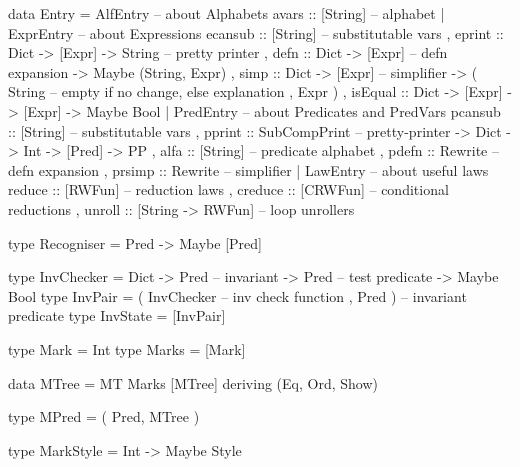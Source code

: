 \begin{code}
data Entry =
   AlfEntry {   -- about Alphabets
    avars   :: [String]  -- alphabet
   }
 | ExprEntry { -- about Expressions
     ecansub :: [String]                   -- substitutable vars
   , eprint  :: Dict -> [Expr] -> String   -- pretty printer
   , defn    :: Dict -> [Expr]             -- defn expansion
             -> Maybe (String, Expr)
   , simp    :: Dict -> [Expr]                 -- simplifier
             -> ( String -- empty if no change, else explanation
                , Expr )
   , isEqual :: Dict -> [Expr] -> [Expr] -> Maybe Bool
   }
 | PredEntry {    -- about Predicates and PredVars
     pcansub :: [String]                   -- substitutable vars
   , pprint  :: SubCompPrint                 -- pretty-printer
             -> Dict -> Int -> [Pred]
             -> PP
   , alfa :: [String]                      -- predicate alphabet
   , pdefn   :: Rewrite                      -- defn expansion
   , prsimp  :: Rewrite                          -- simplifier
   }
 | LawEntry {  -- about useful laws
     reduce  :: [RWFun]            -- reduction laws
   , creduce :: [CRWFun]           -- conditional reductions
   , unroll  :: [String -> RWFun]  -- loop unrollers
   }
\end{code}

\begin{code}
type Recogniser = Pred -> Maybe [Pred]
\end{code}

\begin{code}
type InvChecker
 = Dict
   -> Pred     -- invariant
   -> Pred     -- test predicate
   -> Maybe Bool
type InvPair
 = ( InvChecker  -- inv check function
   , Pred )      -- invariant predicate
type InvState = [InvPair]
\end{code}

\newpage
{}

\begin{code}
type Mark = Int
type Marks = [Mark]
\end{code}

\begin{code}
data MTree = MT Marks [MTree] deriving (Eq, Ord, Show)
\end{code}

\begin{code}
type MPred = ( Pred, MTree )
\end{code}

\begin{code}
type MarkStyle = Int -> Maybe Style
\end{code}

